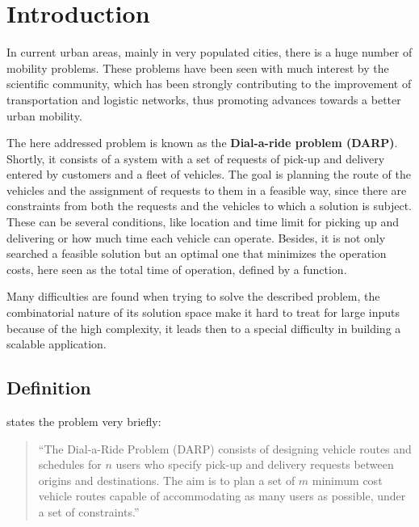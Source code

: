 \documentclass[tuberlin,cic,tc,openright,english,noabntcite,oneside]{iiufrgs}
\begin{document}

\tableofcontents


\chapter{Introduction}
In current urban areas, mainly in very populated cities, there is a huge number of mobility problems. These problems have been seen with much interest by the scientific community, which has been strongly contributing to the improvement of transportation and logistic networks, thus promoting advances towards a better urban mobility.

The here addressed problem is known as the \textbf{Dial-a-ride problem (DARP)}. Shortly, it consists of a system with a set of requests of pick-up and delivery entered by customers and a fleet of vehicles. The goal is planning the route of the vehicles and the assignment of requests to them in a feasible way, since there are constraints from both the requests and the vehicles to which a solution is subject. These can be several conditions, like location and time limit for picking up and delivering or how much time each vehicle can operate. Besides, it is not only searched a feasible solution but an optimal one that minimizes the operation costs, here seen as the total time of operation, defined by a function.

Many difficulties are found when trying to solve the described problem, the combinatorial nature of its solution space make it hard to treat for large inputs because of the high complexity, it leads then to a special difficulty in building a scalable application.

\section{Definition}

\textcite[p. 29]{cordeau_dial--ride_2007} states the problem very briefly:
\begin{quote}
\enquote{The Dial-a-Ride Problem (DARP) consists of designing vehicle routes and schedules for $n$ users who specify pick-up and delivery requests between origins and destinations. The aim is to plan a set of $m$ minimum cost vehicle routes capable of accommodating as many users as possible, under a set of constraints.}
\end{quote}
\end{document}
